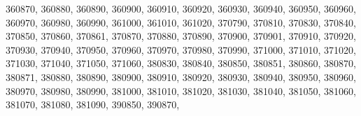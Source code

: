 \textquotesingle{}360870\textquotesingle{}, \textquotesingle{}360880\textquotesingle{}, \textquotesingle{}360890\textquotesingle{}, \textquotesingle{}360900\textquotesingle{}, \textquotesingle{}360910\textquotesingle{}, \textquotesingle{}360920\textquotesingle{}, \textquotesingle{}360930\textquotesingle{}, \textquotesingle{}360940\textquotesingle{}, \textquotesingle{}360950\textquotesingle{}, \textquotesingle{}360960\textquotesingle{}, \textquotesingle{}360970\textquotesingle{}, \textquotesingle{}360980\textquotesingle{}, \textquotesingle{}360990\textquotesingle{}, \textquotesingle{}361000\textquotesingle{}, \textquotesingle{}361010\textquotesingle{}, \textquotesingle{}361020\textquotesingle{}, \textquotesingle{}370790\textquotesingle{}, \textquotesingle{}370810\textquotesingle{}, \textquotesingle{}370830\textquotesingle{}, \textquotesingle{}370840\textquotesingle{}, \textquotesingle{}370850\textquotesingle{}, \textquotesingle{}370860\textquotesingle{}, \textquotesingle{}370861\textquotesingle{}, \textquotesingle{}370870\textquotesingle{}, \textquotesingle{}370880\textquotesingle{}, \textquotesingle{}370890\textquotesingle{}, \textquotesingle{}370900\textquotesingle{}, \textquotesingle{}370901\textquotesingle{}, \textquotesingle{}370910\textquotesingle{}, \textquotesingle{}370920\textquotesingle{}, \textquotesingle{}370930\textquotesingle{}, \textquotesingle{}370940\textquotesingle{}, \textquotesingle{}370950\textquotesingle{}, \textquotesingle{}370960\textquotesingle{}, \textquotesingle{}370970\textquotesingle{}, \textquotesingle{}370980\textquotesingle{}, \textquotesingle{}370990\textquotesingle{}, \textquotesingle{}371000\textquotesingle{}, \textquotesingle{}371010\textquotesingle{}, \textquotesingle{}371020\textquotesingle{}, \textquotesingle{}371030\textquotesingle{}, \textquotesingle{}371040\textquotesingle{}, \textquotesingle{}371050\textquotesingle{}, \textquotesingle{}371060\textquotesingle{}, \textquotesingle{}380830\textquotesingle{}, \textquotesingle{}380840\textquotesingle{}, \textquotesingle{}380850\textquotesingle{}, \textquotesingle{}380851\textquotesingle{}, \textquotesingle{}380860\textquotesingle{}, \textquotesingle{}380870\textquotesingle{}, \textquotesingle{}380871\textquotesingle{}, \textquotesingle{}380880\textquotesingle{}, \textquotesingle{}380890\textquotesingle{}, \textquotesingle{}380900\textquotesingle{}, \textquotesingle{}380910\textquotesingle{}, \textquotesingle{}380920\textquotesingle{}, \textquotesingle{}380930\textquotesingle{}, \textquotesingle{}380940\textquotesingle{}, \textquotesingle{}380950\textquotesingle{}, \textquotesingle{}380960\textquotesingle{}, \textquotesingle{}380970\textquotesingle{}, \textquotesingle{}380980\textquotesingle{}, \textquotesingle{}380990\textquotesingle{}, \textquotesingle{}381000\textquotesingle{}, \textquotesingle{}381010\textquotesingle{}, \textquotesingle{}381020\textquotesingle{}, \textquotesingle{}381030\textquotesingle{}, \textquotesingle{}381040\textquotesingle{}, \textquotesingle{}381050\textquotesingle{}, \textquotesingle{}381060\textquotesingle{}, \textquotesingle{}381070\textquotesingle{}, \textquotesingle{}381080\textquotesingle{}, \textquotesingle{}381090\textquotesingle{}, \textquotesingle{}390850\textquotesingle{}, \textquotesingle{}390870\textquotesingle{}, 